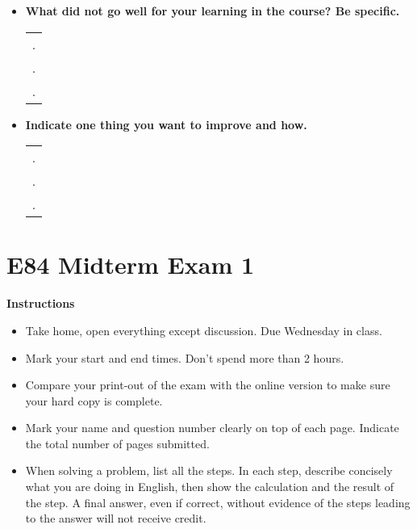\begin{itemize}
\begin{itemize}
 \item {\bf What did not go well for your learning in the course? Be specific.}
 \begin{tabular}{l}
 .  \\
 .  \\
 .  \\
 \end{tabular}
 \vskip 0.9in

 \item {\bf Indicate one thing you want to improve and how.}
 \begin{tabular}{l}
 .  \\
 .  \\
 .  \\
 \end{tabular}
 \vskip 0.9in

 \end{itemize}

 \end{itemize}


 \section*{E84 Midterm Exam 1}

 {\bf Instructions}
 \begin{itemize}
 \item Take home, open everything except discussion. Due Wednesday in class.
 \item Mark your start and end times. Don't spend more than 2 hours.
 \item Compare your print-out of the exam with the online version to make
         sure your hard copy is complete.
 \item Mark your name and question number clearly on top of each page.
         Indicate the total number of pages submitted.
 \item When solving a problem, list all the steps. In each step, describe 
         concisely what you are doing in English, then show the calculation 
         and the result of the step. A final answer, even if correct, without 
         evidence of the steps leading to the answer will not receive credit.
 \end{itemize}


